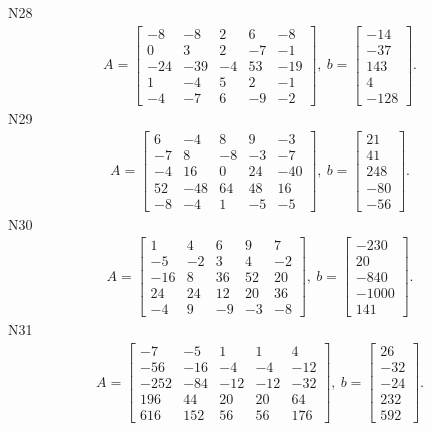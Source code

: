 \documentclass[11pt]{report}
\begin{document}
N28
\begin{align*}
 A = \left[\begin{matrix}-8 & -8 & 2 & 6 & -8\\0 & 3 & 2 & -7 & -1\\-24 & -39 & -4 & 53 & -19\\1 & -4 & 5 & 2 & -1\\-4 & -7 & 6 & -9 & -2\end{matrix}\right],
\ b = \left[\begin{matrix}-14\\-37\\143\\4\\-128\end{matrix}\right]. 
 \end{align*}
N29
\begin{align*}
 A = \left[\begin{matrix}6 & -4 & 8 & 9 & -3\\-7 & 8 & -8 & -3 & -7\\-4 & 16 & 0 & 24 & -40\\52 & -48 & 64 & 48 & 16\\-8 & -4 & 1 & -5 & -5\end{matrix}\right],
\ b = \left[\begin{matrix}21\\41\\248\\-80\\-56\end{matrix}\right]. 
 \end{align*}
N30
\begin{align*}
 A = \left[\begin{matrix}1 & 4 & 6 & 9 & 7\\-5 & -2 & 3 & 4 & -2\\-16 & 8 & 36 & 52 & 20\\24 & 24 & 12 & 20 & 36\\-4 & 9 & -9 & -3 & -8\end{matrix}\right],
\ b = \left[\begin{matrix}-230\\20\\-840\\-1000\\141\end{matrix}\right]. 
 \end{align*}
N31
\begin{align*}
 A = \left[\begin{matrix}-7 & -5 & 1 & 1 & 4\\-56 & -16 & -4 & -4 & -12\\-252 & -84 & -12 & -12 & -32\\196 & 44 & 20 & 20 & 64\\616 & 152 & 56 & 56 & 176\end{matrix}\right],
\ b = \left[\begin{matrix}26\\-32\\-24\\232\\592\end{matrix}\right]. 
 \end{align*}
\end{document}
